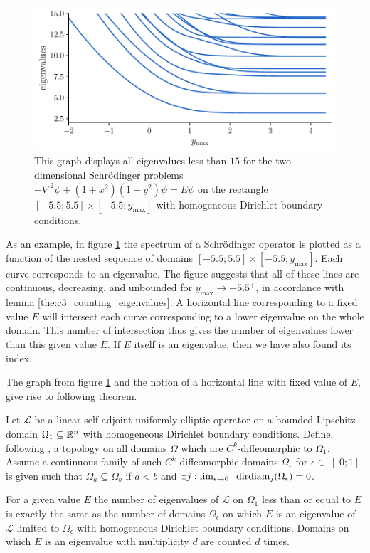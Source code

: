 \begin{figure}
  \begin{center}
    \includegraphics[width=.8\textwidth]{img/chapter3/counting/counting_eigenvalues.pdf}
    \caption{\label{fig:eigenvalue_graph} This graph displays all eigenvalues less than $15$ for the two-dimensional Schrödinger problems $-\nabla^2 \psi + (1+x^2)(1+y^2)\psi = E \psi$ on the rectangle $[-5.5; 5.5]\times[-5.5; y_{\text{max}}]$ with homogeneous Dirichlet boundary conditions.}
  \end{center}
\end{figure}

As an example, in figure \ref{fig:eigenvalue_graph} the spectrum of a Schrödinger operator is plotted as a function of the nested sequence of domains $[-5.5; 5.5] \times [-5.5; y_{\text{max}}]$. Each curve corresponds to an eigenvalue. The figure suggests that all of these lines are continuous, decreasing, and unbounded for $y_{\text{max}} \to -5.5^{+}$, in accordance with lemma \ref{the:c3_counting_eigenvalues}. A horizontal line corresponding to a fixed value $E$ will intersect each curve corresponding to a lower eigenvalue on the whole domain. This number of
intersection thus gives the number of eigenvalues lower than this given value $E$. If $E$ itself is an eigenvalue, then we have also found its index.

The graph from figure \ref{fig:eigenvalue_graph} and the notion of a horizontal line with fixed value of $E$, give rise to following theorem.

\begin{theorem}\label{col:counting_eigenvalues}
  Let $\mathcal{L}$ be a linear self-adjoint uniformly elliptic operator on a bounded Lipschitz domain $\Omega_1 \subseteq \mathbb{R}^n$ with homogeneous Dirichlet boundary conditions. Define, following \cite{hale_eigenvalues_2005}, a topology on all domains $\Omega$ which are $C^k$-diffeomorphic to $\Omega_1$.  Assume a continuous family of such $C^k$-diffeomorphic domains $\Omega_\epsilon$ for $\epsilon\in\left]0; 1\right]$ is given such that $\Omega_a \subseteq \Omega_b$ if $a < b$ and $\exists j : \lim_{\epsilon\to 0^+} \operatorname{dirdiam}_j(\Omega_\epsilon) = 0$.

  For a given value $E$ the number of eigenvalues of $\mathcal{L}$ on $\Omega_1$ less than or equal to $E$ is exactly the same as the number of domains $\Omega_\epsilon$ on which $E$ is an eigenvalue of $\mathcal{L}$ limited to $\Omega_\epsilon$ with homogeneous Dirichlet boundary conditions. Domains on which $E$ is an eigenvalue with multiplicity $d$ are counted $d$ times.
\end{theorem}

